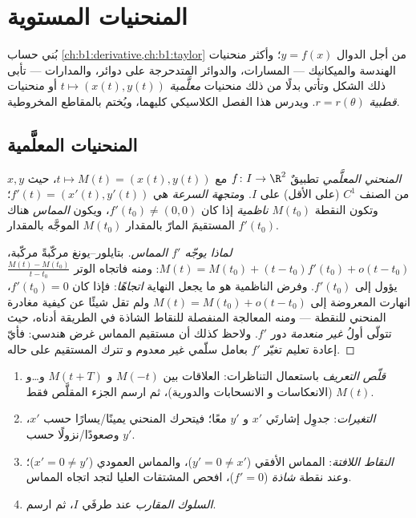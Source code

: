 \chapter{المنحنيات المستوية}\label{ch:b1:curves}

بُني حساب \cref{ch:b1:derivative,ch:b1:taylor} من أجل
الدوال $y = f(x)$؛ وأكثر منحنيات الهندسة والميكانيك ---
المسارات، والدوائر المتدحرجة على دوائر، والمدارات --- تأبى ذلك الشكل
وتأتي بدلًا من ذلك منحنيات \emph{معلَّمية} $t \mapsto (x(t),
y(t))$ أو منحنيات \emph{قطبية} $r = r(\theta)$. ويدرس هذا الفصل
الكلاسيكي كليهما، ويُختم بالمقاطع المخروطية.

\section{المنحنيات المعلَّمية}

\begin{definition}\label{def:b1:curves:def}
\emph{المنحني المعلَّمي} تطبيقٌ $f
\colon I \to \R^2$ مع $t \mapsto M(t) = (x(t), y(t))$، حيث $x, y$ من
الصنف $C^1$ (على الأقل) على  $I$. و\emph{متجهة
السرعة} هي $f'(t) = (x'(t), y'(t))$؛ وتكون النقطة $M(t_0)$
\emph{ناظمية} إذا كان $f'(t_0) \neq (0,0)$، ويكون \emph{المماس}
هناك المستقيمَ المارّ بالمقدار $M(t_0)$ الموجَّه بالمقدار $f'(t_0)$.
\end{definition}

\begin{proof}[لماذا يوجّه $f'$ المماس]
بتايلور--يونغ مركّبةً مركّبة، $M(t) = M(t_0) + (t - t_0) f'(t_0) +
o(t - t_0)$: ومنه فاتجاه الوتر $\frac{M(t) - M(t_0)}{t - t_0}$
يؤول إلى $f'(t_0)$. وفرض الناظمية هو ما يجعل
النهاية \emph{اتجاهًا}: فإذا كان $f'(t_0) = 0$، انهارت المعروضة
إلى $M(t) = M(t_0) + o(t - t_0)$ ولم تقل شيئًا عن كيفية مغادرة
المنحني للنقطة --- ومنه المعالجة المنفصلة
للنقاط الشاذة في الطريقة أدناه، حيث تتولّى أولُ 
\emph{غير منعدمة} دور $f'$.
ولاحظ كذلك أن مستقيم المماس غرض هندسي: فأيّ
إعادة تعليم تغيّر $f'$ بعامل سلّمي غير معدوم و
تترك المستقيم على حاله.
\end{proof}

\begin{method}\label{met:b1:curves:study}
\begin{enumerate}
  \item \emph{قلّص  التعريف} باستعمال التناظرات: العلاقات بين
        $M(-t)$ و $M(t + T)$ و\dots و $M(t)$ (الانعكاسات و
        الانسحابات والدورية)، ثم ارسم الجزء المقلَّص فقط.
  \item \emph{التغيرات}: جدوِل إشارتَي $x'$ و $y'$ معًا؛
        فيتحرك المنحني يمينًا/يسارًا حسب $x'$، وصعودًا/نزولًا حسب $y'$.
  \item \emph{النقاط اللافتة}: المماس الأفقي ($y' = 0 \neq
        x'$)، والمماس العمودي ($x' = 0 \neq y'$)؛ وعند
        نقطة \emph{شاذة} ($f' = 0$)، افحص المشتقات العليا
        لتجد اتجاه المماس.
  \item \emph{السلوك المقارب} عند طرفَي $I$، ثم ارسم.
\end{enumerate}
\end{method}

